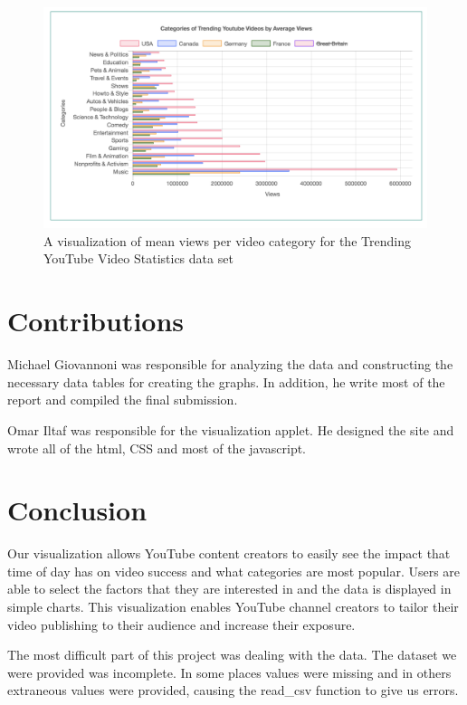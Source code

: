 \documentclass[journal]{vgtc}                %
\begin{document}
\begin{figure}[tb]
	\centering %
	\includegraphics[width=1\columnwidth]{category}
	\caption{A visualization of mean views per video category for the Trending YouTube Video Statistics data set}
	\label{fig:category}
\end{figure}

\section{Contributions}
Michael Giovannoni was responsible for analyzing the data and constructing the necessary data tables for creating the graphs. In addition, he write most of the report and compiled the final submission.

Omar Iltaf was responsible for the visualization applet. He designed the site and wrote all of the html, CSS and most of the javascript.  


\section{Conclusion}

Our visualization allows YouTube content creators to easily see the impact that time of day has on video success and what categories are most popular. Users are able to select the factors that they are interested in and the data is displayed in simple charts. This visualization enables YouTube channel creators to tailor their video publishing to their audience and increase their exposure. 

The most difficult part of this project was dealing with the data. The dataset we were provided was incomplete. In some places values were missing and in others extraneous values were provided, causing the read\_csv function to give us errors. 
\end{document}
